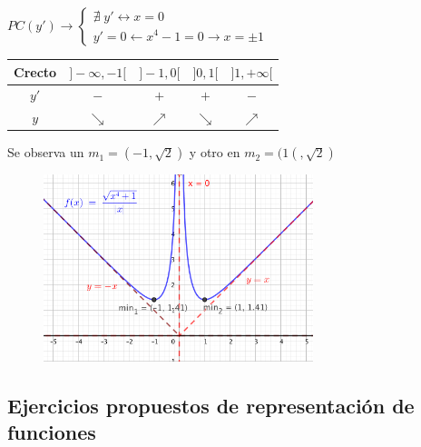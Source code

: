 \begin{proofw}
$PC(y') \to \begin{cases}
 \nexists \; y' \leftrightarrow x=0 \\
 y'=0 \leftarrow x^4-1=0 \to x=\pm 1	
 \end{cases}$	
 

 
 	\begin{table}[H]
 	\centering
	\begin{tabular}{|c|c|c|c|c|}
	\hline
 	Crecto& $]-\infty,-1[$ & $]-1,0[$ & $]0,1[$ & $]1,+\infty[$ \\ \hline
	$y'$&$-$  & $+$  & $+$  & $-$  \\ \hline
	$y$& $\searrow$ & $\nearrow$ & $\searrow$ & $\nearrow$ \\ \hline
	\end{tabular}
\end{table}



Se observa un $m_1=(-1,\sqrt 2)$ y otro en  $m_2=(1(,\sqrt 2)$

	\begin{figure}[H]
		\centering
		\includegraphics[width=0.7\textwidth]{imagenes/imagenes05/T05IM40.png}
	\end{figure}	
	


\end{proofw} 



\subsection{Ejercicios propuestos de representación de funciones}

